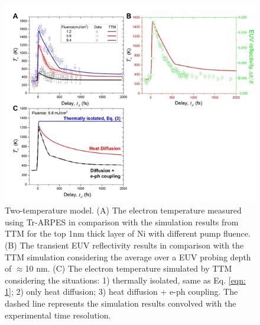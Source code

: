 \begin{figure}[htbp]
	\begin{center}
		\includegraphics[width=150mm]{figs/NiFigS9}
	\end{center}
	\caption{Two-temperature model. (A) The electron temperature measured using Tr-ARPES in comparison with the simulation results from TTM for the top 1nm thick layer of Ni with different pump fluence. (B) The transient EUV reflectivity results in comparison with the TTM simulation considering the average over a EUV probing depth of $\approx$10 nm. (C) The electron temperature simulated by TTM considering the situations: 1) thermally isolated, same as Eq. \ref{eqn: 1}; 2) only heat diffusion; 3) heat diffusion + e-ph coupling. The dashed line represents the simulation results convolved with the experimental time resolution. }
	\label{fig: NiSIfig9}
\end{figure}